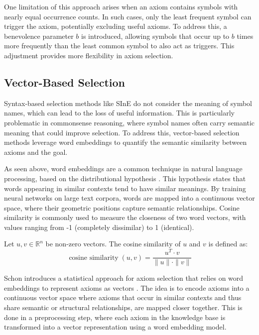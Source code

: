 \documentclass[english,version-2020-11]{uzl-thesis}
\begin{document}
One limitation of this approach arises when an axiom contains symbols with nearly equal occurrence counts. In such cases, only the least frequent symbol can trigger the axiom, potentially excluding useful axioms. To address this, a benevolence parameter \( b \) is introduced, allowing symbols that occur up to \( b \) times more frequently than the least common symbol to also act as triggers. This adjustment provides more flexibility in axiom selection.

\subsection{Vector-Based Selection}

Syntax-based selection methods like SInE do not consider the meaning of symbol names, which can lead to the loss of useful information. This is particularly problematic in commonsense reasoning, where symbol names often carry semantic meaning that could improve selection. To address this, vector-based selection methods leverage word embeddings to quantify the semantic similarity between axioms and the goal.

As seen above, word embeddings are a common technique in natural language processing, based on the distributional hypothesis \cite{Miller1991}. This hypothesis states that words appearing in similar contexts tend to have similar meanings. By training neural networks on large text corpora, words are mapped into a continuous vector space, where their geometric positions capture semantic relationships. Cosine similarity is commonly used to measure the closeness of two word vectors, with values ranging from -1 (completely dissimilar) to 1 (identical).

\begin{definition}
    Let \( u, v \in \mathbb{R}^n \) be non-zero vectors. The cosine similarity of \( u \) and \( v \) is defined as:
    \begin{equation}
        \operatorname{cosine\ similarity}(u, v) = \frac{u^T \cdot v}{\|u\| \cdot \|v\|}
    \end{equation}
\end{definition}

Schon introduces a statistical approach for axiom selection that relies on word embeddings to represent axioms as vectors \cite{Schon2023}. The idea is to encode axioms into a continuous vector space where axioms that occur in similar contexts and thus share semantic or structural relationships, are mapped closer together. This is done in a preprocessing step, where each axiom in the knowledge base is transformed into a vector representation using a word embedding model.
\end{document}
